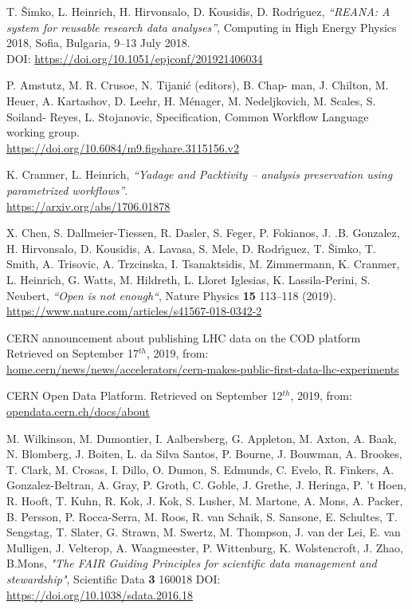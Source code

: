\begin{thebibliography}{9}

T. Šimko, L. Heinrich, H. Hirvonsalo, D. Kousidis, D. Rodrı́guez,
\textit{“REANA: A system for reusable research data analyses”}, Computing in High Energy Physics 2018, Sofia, Bulgaria, 9–13 July 2018.\\
DOI: \url{https://doi.org/10.1051/epjconf/201921406034}

P. Amstutz, M. R. Crusoe, N. Tijanić (editors), B. Chap-
man, J. Chilton, M. Heuer, A. Kartashov, D. Leehr,
H. Ménager, M. Nedeljkovich, M. Scales, S. Soiland-
Reyes, L. Stojanovic, 
Specification, Common Workflow Language working group.\\
\url{https://doi.org/10.6084/m9.figshare.3115156.v2}

K. Cranmer, L. Heinrich, \textit{“Yadage and Packtivity – analysis preservation using parametrized workflows”}.\\
\url{https://arxiv.org/abs/1706.01878}

X. Chen, S. Dallmeier-Tiessen, R. Dasler, S. Feger, P. Fokianos,
J. .B. Gonzalez, H. Hirvonsalo, D. Kousidis, A. Lavasa, S. Mele,
D. Rodrı́guez, T. Šimko, T. Smith, A. Trisovic, A. Trzcinska,
I. Tsanaktsidis, M. Zimmermann, K. Cranmer, L. Heinrich, G. Watts,
M. Hildreth, L. Lloret Iglesias, K. Lassila-Perini, S. Neubert,
\textit{“Open is not enough“}, Nature Physics \textbf{15} 113–118 (2019).\\
\url{https://www.nature.com/articles/s41567-018-0342-2}

CERN announcement about publishing LHC data on the COD platform
Retrieved on September 17$^{th}$, 2019, from:\\ \url{home.cern/news/news/accelerators/cern-makes-public-first-data-lhc-experiments}

CERN Open Data Platform.
Retrieved on September 12$^{th}$, 2019, from:\\
\url{opendata.cern.ch/docs/about}

M. Wilkinson, M. Dumontier, I. Aalbersberg, G. Appleton, M. Axton, A. Baak, N. Blomberg, J. Boiten, L. da Silva Santos, P. Bourne, J. Bouwman,  A. Brookes, T. Clark, M. Crosas, I. Dillo, O. Dumon, S. Edmunds, C. Evelo, R. Finkers, A. Gonzalez-Beltran,  A. Gray, P. Groth, C. Goble, J. Grethe, J. Heringa, P. ’t Hoen, R. Hooft, T. Kuhn, R. Kok, J. Kok, S. Lusher, M. Martone, A. Mons, A. Packer, B. Persson, P. Rocca-Serra, M. Roos, R. van Schaik, S. Sansone, E. Schultes, T. Sengstag, T. Slater, G. Strawn, M. Swertz, M. Thompson, J. van der Lei, E. van Mulligen, J. Velterop, A. Waagmeester, P. Wittenburg, K. Wolstencroft, J. Zhao, B.Mons, \textit{"The FAIR Guiding Principles for scientific data management and stewardship"}, Scientific Data \textbf{3} 160018 DOI: \url{https://doi.org/10.1038/sdata.2016.18}


\end{thebibliography}
